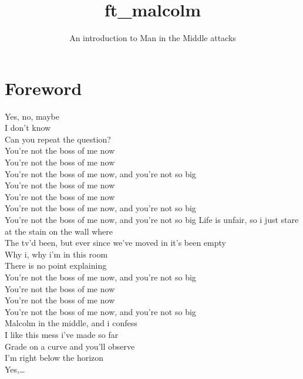 \documentclass{42-en}
\begin{document}
                           \title{ft\_malcolm}
                          \subtitle{An introduction to Man in the Middle attacks}

\maketitle

\tableofcontents


\chapter{Foreword}

    Yes, no, maybe\\
    I don't know\\
    Can you repeat the question?\\
    You're not the boss of me now\\
    You're not the boss of me now\\
    You're not the boss of me now, and you're not so big\\
    You're not the boss of me now\\
    You're not the boss of me now\\
    You're not the boss of me now, and you're not so big\\
    You're not the boss of me now, and you're not so big
    Life is unfair, so i just stare at the stain on the wall where\\
    The tv'd been, but ever since we've moved in it's been empty\\
    Why i, why i'm in this room\\
    There is no point explaining\\
    You're not the boss of me now, and you're not so big\\
    You're not the boss of me now\\
    You're not the boss of me now\\
    You're not the boss of me now, and you're not so big\\
    Malcolm in the middle, and i confess\\
    I like this mess i've made so far\\
    Grade on a curve and you'll observe\\
    I'm right below the horizon\\
    Yes,… \\
\end{document}

